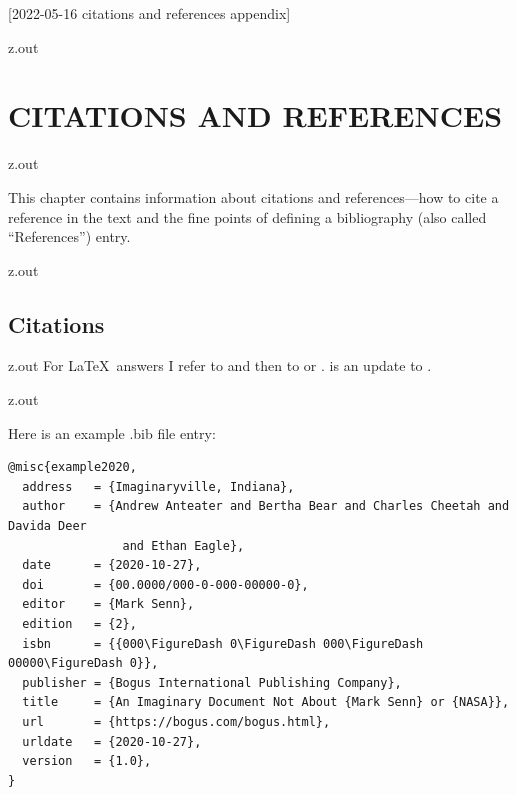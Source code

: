 [2022-05-16 citations and references appendix]

\begin{VerbatimOut}{z.out}
\chapter{CITATIONS AND REFERENCES}
\end{VerbatimOut}

\MyIO


\begin{VerbatimOut}{z.out}

This chapter contains information about citations
and references---how to cite a reference in the text
and the fine points of defining a bibliography
(also called ``References'')
entry.
\end{VerbatimOut}

\MyIO


\begin{VerbatimOut}{z.out}


\section{Citations}
\end{VerbatimOut}

\MyIO


\begin{VerbatimOut}{z.out}
For \LaTeX\ answers I refer to
\cite{lamport1994}
and then to
\cite{goossens1994}
or
\cite{kopka1999}.
\cite{kopka1999}
is an update to
\cite{kopka1995}.
\end{VerbatimOut}

\MyIO


\begin{VerbatimOut}{z.out}

Here is an example .bib file entry:

{\footnotesize
\begin{verbatim}
@misc{example2020,
  address   = {Imaginaryville, Indiana},
  author    = {Andrew Anteater and Bertha Bear and Charles Cheetah and Davida Deer
                and Ethan Eagle},
  date      = {2020-10-27},
  doi       = {00.0000/000-0-000-00000-0},
  editor    = {Mark Senn},
  edition   = {2},
  isbn      = {{000\FigureDash 0\FigureDash 000\FigureDash 00000\FigureDash 0}},
  publisher = {Bogus International Publishing Company},
  title     = {An Imaginary Document Not About {Mark Senn} or {NASA}},
  url       = {https://bogus.com/bogus.html},
  urldate   = {2020-10-27},
  version   = {1.0},
}
\end{verbatim}
}
\end{VerbatimOut}

